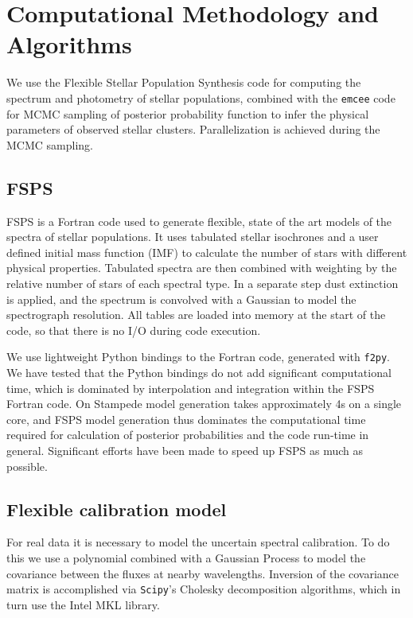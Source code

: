\documentclass[11pt,preprint]{aastex}
\begin{document}
\section{ Computational Methodology and Algorithms}
We use the Flexible Stellar Population Synthesis \citep[FSPS;][]{fspsI, fspsIII} code for computing the spectrum and photometry of stellar populations, combined with the \texttt{emcee} code for MCMC sampling of posterior probability function to infer the physical parameters of observed stellar clusters.  Parallelization is achieved during the MCMC sampling.

\subsection{FSPS}
FSPS is a Fortran code used to generate flexible, state of the art models of the spectra of stellar populations.  It uses tabulated stellar isochrones and a user defined initial mass function (IMF) to calculate the number of stars with different physical properties.  Tabulated spectra are then combined with weighting by the relative number of stars of each spectral type.  In a separate step dust extinction is applied, and the spectrum is convolved with a Gaussian to model the spectrograph resolution.  All tables are loaded into memory at the start of the code, so that there is no I/O during code execution.

We use lightweight Python bindings to the Fortran code, generated with \texttt{f2py}.  We have tested that the Python bindings do not add significant computational time, which is dominated by interpolation and integration within the FSPS Fortran code.  On Stampede model generation takes approximately 4s on a single core, and FSPS model generation thus dominates the computational time required for calculation of posterior probabilities and the code run-time in general. Significant efforts have been made to speed up FSPS as much as possible.

\subsection{Flexible calibration model}
For real data it is necessary to model the uncertain spectral calibration.  To do this we use a polynomial combined with a Gaussian Process \citep[e.g.,][]{RW} to model the covariance between the fluxes at nearby wavelengths.  Inversion of the covariance matrix is accomplished via \texttt{Scipy}'s Cholesky decomposition algorithms, which in turn use the Intel MKL library.
\end{document}
